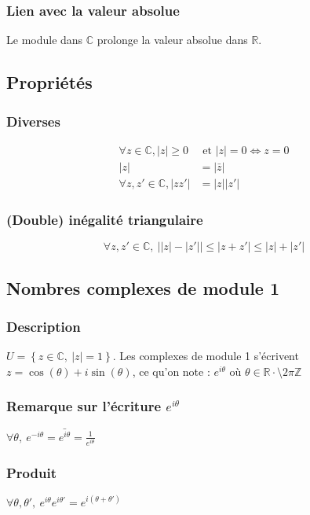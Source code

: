 \documentclass[12pt,a4paper,french]{book}
\begin{document}
			\subsubsection{Lien avec la valeur absolue}
			Le module dans $\mathbb{C}$ prolonge la valeur absolue dans $\mathbb{R}$.
		\subsection{Propriétés}
			\subsubsection{Diverses}
			\[\begin{split}
				\forall z \in \mathbb{C},\left| z\right| \geqslant 0 &\mbox{ et } \left| z\right| = 0 \Leftrightarrow z= 0 \\
				\left| z \right| &= \left| \bar{z} \right| \\
				\forall z,z' \in \mathbb{C},\left| zz' \right|& = \left| z \right| \left| z' \right| 
			\end{split} \]
			\subsubsection{(Double) inégalité triangulaire}
			\[\forall z,z' \in \mathbb{C},\ \left|\left|z\right|-\left|z'\right|\right|\leqslant\left|z+z'\right| \leqslant \left|z\right| + \left|z'\right|\]
		\subsection{Nombres complexes de module 1}
			\subsubsection{Description}
			$U = \left\{z \in \mathbb{C}, \ \left|z\right| = 1\right\}$. Les complexes de module 1 s'écrivent $z = \cos(\theta)+i\sin(\theta)$, ce qu'on note : $ e^{i\theta}$ où $\theta \in \mathbb{R} \cdot\setminus 2\pi \mathbb{Z}$
			\subsubsection{Remarque sur l'écriture $e^{i\theta}$}
			$\forall \theta, \ e^{-i\theta} = \bar{e^{i\theta}} = \frac{1}{e^{i\theta}} $
			\subsubsection{Produit}
			$\forall \theta, \theta', \ e^{i\theta} e^{i\theta'} = e^{i(\theta+\theta')}$
\end{document}
